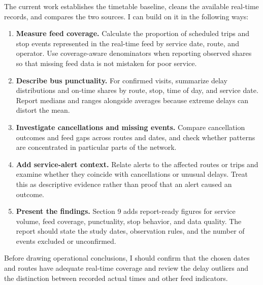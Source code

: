 \documentclass[11pt]{article}
\providecommand{\tightlist}{%
      \setlength{\itemsep}{0pt}\setlength{\parskip}{0pt}}
\begin{document}
The current work establishes the timetable baseline, cleans the
available real-time records, and compares the two sources. I can build
on it in the following ways:

\begin{enumerate}
\def\labelenumi{\arabic{enumi}.}
\tightlist
\item
  \textbf{Measure feed coverage.} Calculate the proportion of scheduled
  trips and stop events represented in the real-time feed by service
  date, route, and operator. Use coverage-aware denominators when
  reporting observed shares so that missing feed data is not mistaken
  for poor service.
\item
  \textbf{Describe bus punctuality.} For confirmed visits, summarize
  delay distributions and on-time shares by route, stop, time of day,
  and service date. Report medians and ranges alongside averages because
  extreme delays can distort the mean.
\item
  \textbf{Investigate cancellations and missing events.} Compare
  cancellation outcomes and feed gaps across routes and dates, and check
  whether patterns are concentrated in particular parts of the network.
\item
  \textbf{Add service-alert context.} Relate alerts to the affected
  routes or trips and examine whether they coincide with cancellations
  or unusual delays. Treat this as descriptive evidence rather than
  proof that an alert caused an outcome.
\item
  \textbf{Present the findings.} Section 9 adds report-ready figures for
  service volume, feed coverage, punctuality, stop behavior, and data
  quality. The report should state the study dates, observation rules,
  and the number of events excluded or unconfirmed.
\end{enumerate}

Before drawing operational conclusions, I should confirm that the chosen
dates and routes have adequate real-time coverage and review the delay
outliers and the distinction between recorded actual times and other
feed indicators.


    
    
    
\end{document}

